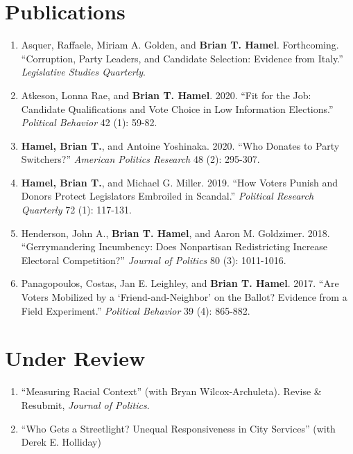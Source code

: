 \documentclass[12pt]{article}
\begin{document}
\section*{Publications}

\begin{enumerate}[topsep = 0pt, itemsep = 1ex, partopsep  = 1ex, parsep = 1ex]

	\item[] Asquer, Raffaele, Miriam A. Golden, and \textbf{Brian T. Hamel}. Forthcoming. ``Corruption, Party Leaders, and Candidate Selection: Evidence from Italy.'' \textit{Legislative Studies Quarterly}.
	
	\item[] Atkeson, Lonna Rae, and \textbf{Brian T. Hamel}. 2020. ``Fit for the Job: Candidate Qualifications and Vote Choice in Low Information Elections.'' \textit{Political Behavior} 42 (1): 59-82.
	
	\item[] \textbf{Hamel, Brian T.}, and Antoine Yoshinaka. 2020. ``Who Donates to Party Switchers?'' \textit{American Politics Research} 48 (2): 295-307.

	\item[] \textbf{Hamel, Brian T.}, and Michael G. Miller. 2019. ``How Voters Punish and Donors Protect Legislators Embroiled in Scandal.'' \textit{Political Research Quarterly} 72 (1): 117-131.

	\item[] Henderson, John A., \textbf{Brian T. Hamel}, and Aaron M. Goldzimer. 2018. ``Gerrymandering Incumbency: Does Nonpartisan Redistricting Increase Electoral Competition?'' \textit{Journal of Politics} 80 (3): 1011-1016.

	\item[] Panagopoulos, Costas, Jan E. Leighley, and \textbf{Brian T. Hamel}. 2017. ``Are Voters Mobilized by a `Friend-and-Neighbor' on the Ballot? Evidence from a Field Experiment.'' \textit{Political Behavior} 39 (4): 865-882.

\end{enumerate}

\section*{Under Review}

\begin{enumerate}[topsep = 0pt, itemsep = 1ex, partopsep  = 1ex, parsep = 1ex]

	\item[] ``Measuring Racial Context'' (with Bryan Wilcox-Archuleta). Revise \& Resubmit, \textit{Journal of Politics}.
	
	\item[] ``Who Gets a Streetlight? Unequal Responsiveness in City Services'' (with Derek E. Holliday)

\end{enumerate}
	
\end{document}
